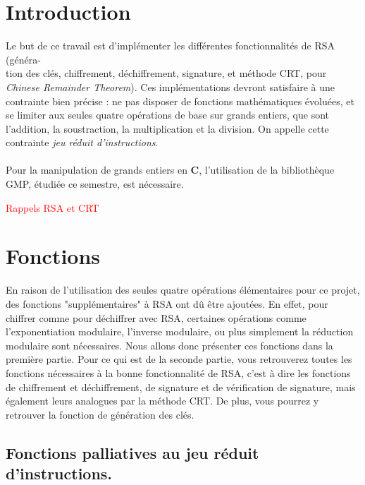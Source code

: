 \documentclass[12pt]{article}
\theoremstyle{remark}\newtheorem{note}{Note}
\theoremstyle{remark}\newtheorem{nota}{Notation}
\theoremstyle{definition}
\begin{document}

\tableofcontents
\pagebreak
\section*{Introduction}

Le but de ce travail est d'implémenter les différentes fonctionnalités de RSA (généra-\\
tion des clés, chiffrement, déchiffrement, signature, et méthode CRT, pour \textit{Chinese Remainder Theorem}). Ces implémentations devront satisfaire à une contrainte bien précise : ne pas disposer de fonctions mathématiques évoluées, et se limiter aux seules quatre opérations de base sur grands entiers, que sont l'addition, la soustraction, la multiplication et la division. On appelle cette contrainte \textit{jeu réduit d'instructions}.\\\\
Pour la manipulation de grands entiers en \textbf{C}, l'utilisation de la bibliothèque GMP, étudiée ce semestre, est nécessaire.


\textcolor{red}{Rappels RSA et CRT}

\pagebreak

\section{Fonctions}
En raison de l'utilisation des seules quatre opérations élémentaires pour ce projet, des fonctions "supplémentaires" à RSA ont dû être ajoutées. En effet, pour chiffrer comme pour déchiffrer avec RSA, certaines opérations comme l'exponentiation modulaire, l'inverse modulaire, ou plus simplement la réduction modulaire sont nécessaires. Nous allons donc présenter ces fonctions dans la première partie. Pour ce qui est de la seconde partie, vous retrouverez toutes les fonctions nécessaires à la bonne fonctionnalité de RSA, c'est à dire les fonctions de chiffrement et déchiffrement, de signature et de vérification de signature, mais également leurs analogues par la méthode CRT. De plus, vous pourrez y retrouver la fonction de génération des clés.

\subsection{Fonctions palliatives au jeu réduit d'instructions.}
\end{document}

